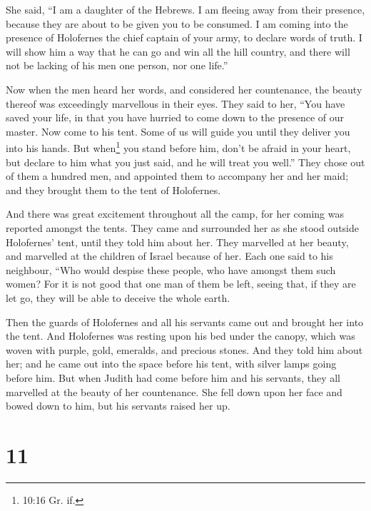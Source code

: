 She said, ``I am a daughter of the Hebrews. I am fleeing away from their
presence, because they are about to be given you to be consumed.
 I am coming into the presence of Holofernes the chief
captain of your army, to declare words of truth. I will show him a way
that he can go and win all the hill country, and there will not be
lacking of his men one person, nor one life.''

 Now when the men heard her words, and considered her
countenance, the beauty thereof was exceedingly marvellous in their
eyes. They said to her,  ``You have saved your life, in
that you have hurried to come down to the presence of our master. Now
come to his tent. Some of us will guide you until they deliver you into
his hands.  But when\footnote{10:16 Gr. if.} you stand
before him, don't be afraid in your heart, but declare to him what you
just said, and he will treat you well.''  They chose out of
them a hundred men, and appointed them to accompany her and her maid;
and they brought them to the tent of Holofernes.

 And there was great excitement throughout all the camp,
for her coming was reported amongst the tents. They came and surrounded
her as she stood outside Holofernes' tent, until they told him about
her.  They marvelled at her beauty, and marvelled at the
children of Israel because of her. Each one said to his neighbour, ``Who
would despise these people, who have amongst them such women? For it is
not good that one man of them be left, seeing that, if they are let go,
they will be able to deceive the whole earth.

 Then the guards of Holofernes and all his servants came
out and brought her into the tent.  And Holofernes was
resting upon his bed under the canopy, which was woven with purple,
gold, emeralds, and precious stones.  And they told him
about her; and he came out into the space before his tent, with silver
lamps going before him.  But when Judith had come before
him and his servants, they all marvelled at the beauty of her
countenance. She fell down upon her face and bowed down to him, but his
servants raised her up.

\hypertarget{section-10}{%
\section{11}\label{section-10}}

